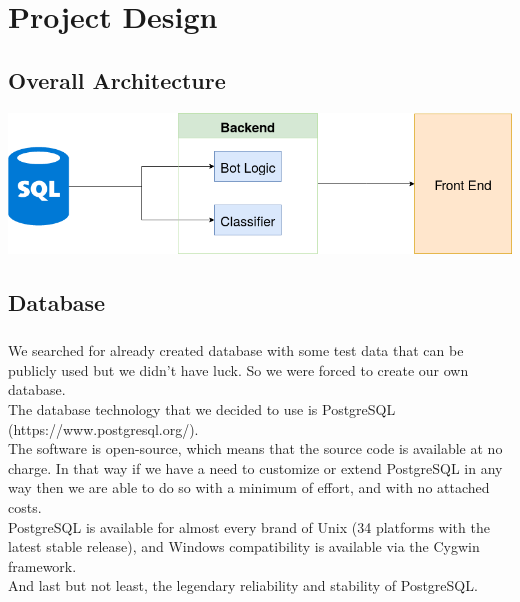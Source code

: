 \chapter{Project Design} %

\section{Overall Architecture}

\includegraphics[height = 0.35\textheight, width = \textwidth]{Architecture}

\section{Database}

\paragraph{}
We searched for already created database with some test data that can be publicly used but we didn’t have luck. So we were forced to create our own database.\\
The database technology that we decided to use is PostgreSQL (https://www.postgresql.org/).\\
The software is open-source, which means that the source code is available at no charge. In that way if we have a need to customize or extend PostgreSQL in any way then we are able to do so with a minimum of effort, and with no attached costs.\\
PostgreSQL is available for almost every brand of Unix (34 platforms with the latest stable release), and Windows compatibility is available via the Cygwin framework.\\
And last but not least, the legendary reliability and stability of PostgreSQL.

